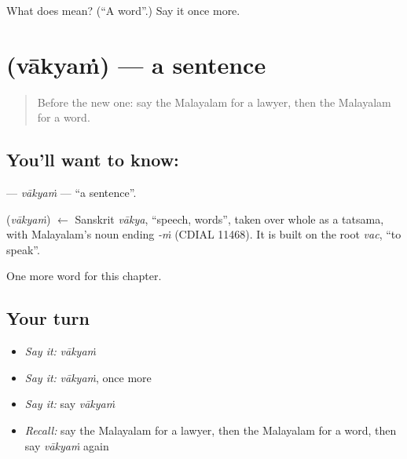 \begin{tcolorbox}[breakable,colback=teal!4,colframe=teal!35!black,title={Before you move on}]
What does  mean? (\textquotedblleft{}A word\textquotedblright{}.) Say it once more.
\end{tcolorbox}
\section[\texorpdfstring{\ml{വാക്യം} (vākyaṁ)}{വാക്യം (vākyaṁ)}]{ (vākyaṁ) — a sentence}

\label{lesson:ML-C221-vakyam}



\begin{quote}
Before the new one: say the Malayalam for a lawyer, then the Malayalam for a word.
\end{quote}

\subsection*{You'll want to know: }
\textbf{} — \emph{vākyaṁ} — \textquotedblleft{}a sentence\textquotedblright{}.

\begin{cousinweb}
\textbf{} (\emph{vākyaṁ}) $\leftarrow$ Sanskrit \emph{vākya}, \textquotedblleft{}speech, words\textquotedblright{}, taken over whole as a tatsama, with Malayalam's noun ending \emph{-ṁ} (CDIAL 11468). It is built on the root \emph{vac}, \textquotedblleft{}to speak\textquotedblright{}.
\end{cousinweb}

\begin{grammarlens}[title={What you've built}]
One more word for this chapter.
\end{grammarlens}

\subsection*{Your turn}
\begin{itemize}
\raggedright
  \item \emph{Say it:} \emph{vākyaṁ}
  \item \emph{Say it:} \emph{vākyaṁ}, once more
  \item \emph{Say it:} say \emph{vākyaṁ}
  \item \emph{Recall:} say the Malayalam for a lawyer, then the Malayalam for a word, then say \emph{vākyaṁ} again
\end{itemize}

